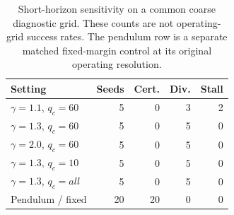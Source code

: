 \begin{table}[t]\centering\caption{Short-horizon sensitivity on a common coarse diagnostic grid. These counts are not operating-grid success rates. The pendulum row is a separate matched fixed-margin control at its original operating resolution.}\label{tab:sensitivity}
\small\begin{tabular}{lrrrr}\hline Setting & Seeds & Cert. & Div. & Stall\\\hline
$\gamma=1.1$, $q_c=60$ & 5 & 0 & 3 & 2\\
$\gamma=1.3$, $q_c=60$ & 5 & 0 & 5 & 0\\
$\gamma=2.0$, $q_c=60$ & 5 & 0 & 5 & 0\\
$\gamma=1.3$, $q_c=10$ & 5 & 0 & 5 & 0\\
$\gamma=1.3$, $q_c=all$ & 5 & 0 & 5 & 0\\
Pendulum / fixed & 20 & 20 & 0 & 0\\
\hline\end{tabular}\end{table}
